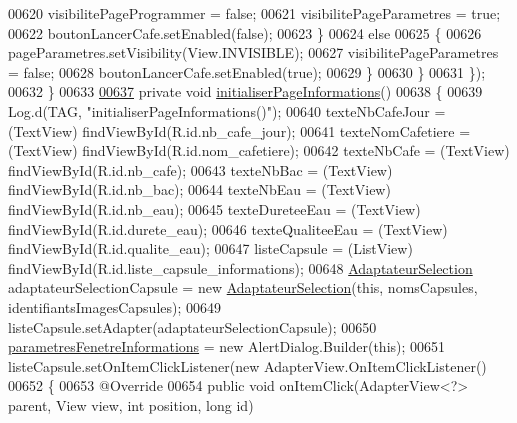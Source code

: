 \begin{DoxyCode}
00620                     visibilitePageProgrammer = \textcolor{keyword}{false};
00621                     visibilitePageParametres = \textcolor{keyword}{true};
00622                     boutonLancerCafe.setEnabled(\textcolor{keyword}{false});
00623                 \}
00624                 \textcolor{keywordflow}{else}
00625                 \{
00626                     pageParametres.setVisibility(View.INVISIBLE);
00627                     visibilitePageParametres = \textcolor{keyword}{false};
00628                     boutonLancerCafe.setEnabled(\textcolor{keyword}{true});
00629                 \}
00630             \}
00631         \});
00632     \}
00633 
\hyperlink{classcom_1_1example_1_1ekawa_1_1_ihm_ad431346f0a437b4f23697208c5048a02}{00637}     \textcolor{keyword}{private} \textcolor{keywordtype}{void} \hyperlink{classcom_1_1example_1_1ekawa_1_1_ihm_ad431346f0a437b4f23697208c5048a02}{initialiserPageInformations}()
00638     \{
00639         Log.d(TAG, \textcolor{stringliteral}{"initialiserPageInformations()"});
00640         texteNbCafeJour = (TextView) findViewById(R.id.nb\_cafe\_jour);
00641         texteNomCafetiere = (TextView) findViewById(R.id.nom\_cafetiere);
00642         texteNbCafe = (TextView) findViewById(R.id.nb\_cafe);
00643         texteNbBac = (TextView) findViewById(R.id.nb\_bac);
00644         texteNbEau = (TextView) findViewById(R.id.nb\_eau);
00645         texteDureteeEau = (TextView) findViewById(R.id.durete\_eau);
00646         texteQualiteeEau = (TextView) findViewById(R.id.qualite\_eau);
00647         listeCapsule = (ListView) findViewById(R.id.liste\_capsule\_informations);
00648         \hyperlink{classcom_1_1example_1_1ekawa_1_1_ihm_1_1_adaptateur_selection}{AdaptateurSelection} adaptateurSelectionCapsule = \textcolor{keyword}{new} 
      \hyperlink{classcom_1_1example_1_1ekawa_1_1_ihm_1_1_adaptateur_selection_a41746ec1a290651b4cacb0894a32307b}{AdaptateurSelection}(\textcolor{keyword}{this}, nomsCapsules, identifiantsImagesCapsules);
00649         listeCapsule.setAdapter(adaptateurSelectionCapsule);
00650         \hyperlink{classcom_1_1example_1_1ekawa_1_1_ihm_a610b25d0bf8b26fbf1ed24345acef189}{parametresFenetreInformations} = \textcolor{keyword}{new} AlertDialog.Builder(\textcolor{keyword}{this});
00651         listeCapsule.setOnItemClickListener(\textcolor{keyword}{new} AdapterView.OnItemClickListener()
00652         \{
00653             @Override
00654             \textcolor{keyword}{public} \textcolor{keywordtype}{void} onItemClick(AdapterView<?> parent, View view, \textcolor{keywordtype}{int} position, \textcolor{keywordtype}{long} \textcolor{keywordtype}{id})

\end{DoxyCode}
